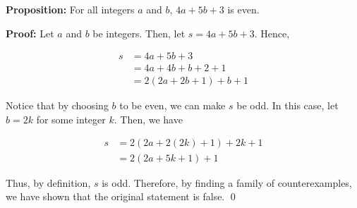 \documentclass{article}
\begin{document}
\textbf{Proposition:} For all integers $a$ and $b$, $4a+5b+3$ is even.

\textbf{Proof:} Let $a$ and $b$ be integers. Then, let $s=4a+5b+3$. Hence,

\begin{align*}
s&=4a+5b+3\\
&=4a+4b+b+2+1\\
&=2(2a+2b+1)+b+1
\end{align*}

Notice that by choosing $b$ to be even, we can make $s$ be odd.
In this case, let $b=2k$ for some integer $k$.
Then, we have

\begin{align*}
s&=2(2a+2(2k)+1)+2k+1\\
&=2(2a+5k+1)+1
\end{align*}

Thus, by definition, $s$ is odd. Therefore, by finding a family of counterexamples, we
have shown that the original statement is false. \qed
\end{document}

